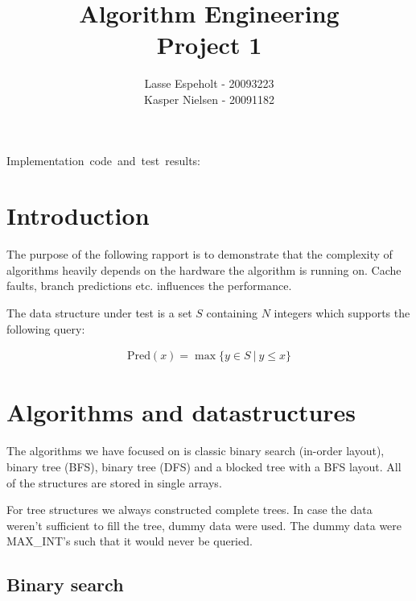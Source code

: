 \documentclass[a4paper]{article}
\begin{document}
\title{Algorithm Engineering\\Project 1}


\author{Lasse Espeholt - 20093223\\
Kasper Nielsen - 20091182}

\maketitle
\vfill{}

\begin{description}
\item [{Implementation~code~and~test~results:}] %
\end{description}
\pagebreak{}\tableofcontents{}\pagebreak{}


\section{Introduction}


The purpose of the following rapport is to demonstrate that the complexity of algorithms heavily depends on the hardware the algorithm is running on. Cache faults, branch predictions etc. influences the performance.

The data structure under test is a set $S$ containing $N$ integers which supports the following query:

\begin{eqnarray*}
\mathrm{Pred}(x) = \max \{ y \in S\ |\ y \leq x \}
\end{eqnarray*}

\section{Algorithms and datastructures}

The algorithms we have focused on is classic binary search (in-order layout), binary tree (BFS), binary tree (DFS) and a blocked tree with a BFS layout. All of the structures are stored in single arrays.


For tree structures we always constructed complete trees. In case the data weren't sufficient to fill the tree, dummy data were used. The dummy data were MAX\_INT's such that it would never be queried.

\subsection{Binary search}
\end{document}
